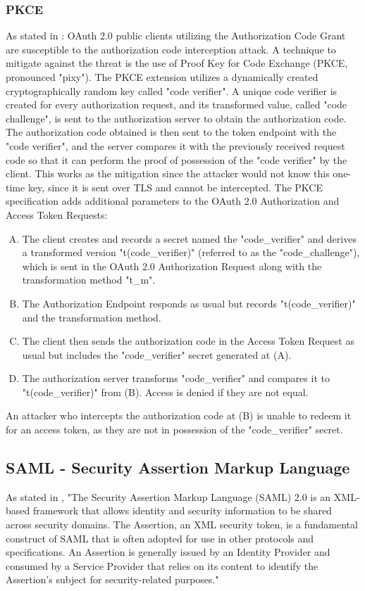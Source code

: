 \subsubsection{PKCE}
As stated in \cite{pkce_downgrade}: OAuth 2.0 public clients utilizing the Authorization Code Grant are susceptible to the authorization code interception attack. A technique to mitigate against the threat is the use of Proof Key for Code Exchange (PKCE, pronounced "pixy"). The PKCE extension utilizes a dynamically created cryptographically random key called "code verifier".  A unique code verifier is created for every authorization request, and its transformed value, called "code challenge", is sent to the authorization server to obtain the authorization code.  The authorization code obtained is then sent to the token endpoint with the "code verifier", and the server compares it with the previously received request code so that it can perform the proof of possession of the "code verifier" by the client.  This works as the mitigation since the attacker would not know this one-time key, since it is sent over TLS and cannot be intercepted.
The PKCE specification adds additional parameters to the OAuth 2.0 Authorization and Access Token Requests:
\begin{enumerate}[(A)]
    \item The client creates and records a secret named the "code\_verifier" and derives a transformed version "t(code\_verifier)" (referred to as the "code\_challenge"), which is sent in the OAuth 2.0 Authorization Request along with the transformation method "t\_m". 
    \item The Authorization Endpoint responds as usual but records "t(code\_verifier)" and the transformation method. 
    \item The client then sends the authorization code in the Access Token Request as usual but includes the "code\_verifier" secret generated at (A). 
    \item The authorization server transforms "code\_verifier" and compares it to "t(code\_verifier)" from (B).  Access is denied if they are not equal.
\end{enumerate}
An attacker who intercepts the authorization code at (B) is unable to redeem it for an access token, as they are not in possession of the "code\_verifier" secret.

\subsection{SAML - Security Assertion Markup Language}
As stated in \cite{ietf_SAML}, "The Security Assertion Markup Language (\Gls{SAML}) 2.0 is an XML-based framework that allows identity and security information to be shared across security domains. The Assertion, an XML security token, is a fundamental construct of \Gls{SAML} that is often adopted for use in other protocols and specifications. An Assertion is generally issued by an Identity Provider and consumed by a Service Provider that relies on its content to identify the Assertion's subject for security-related purposes."





